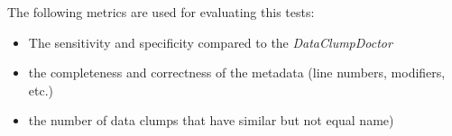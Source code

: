 The following metrics are used for evaluating this tests:

\begin{itemize}
    \item The sensitivity and specificity compared to the \textit{DataClumpDoctor}
    \item the completeness and correctness of the metadata (line numbers, modifiers, etc.)
    \item the number of data clumps that have similar but not equal name)
\end{itemize}
